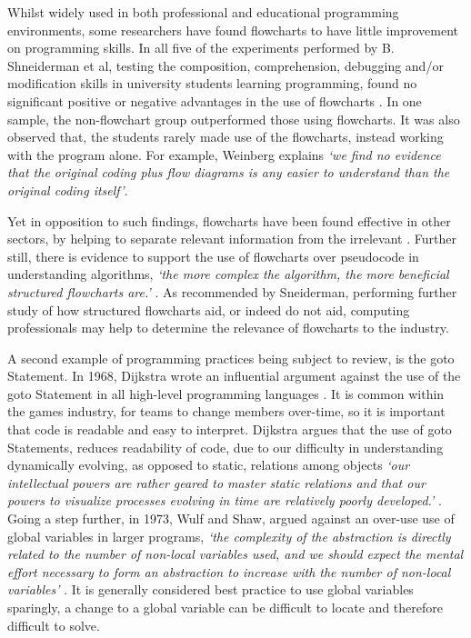 \documentclass{scrartcl}
\begin{document}
Whilst widely used in both professional and educational programming environments, some researchers have found flowcharts to have little improvement on programming skills. In all five of the experiments performed by B. Shneiderman et al, testing the composition, comprehension, debugging and/or modification skills in university students learning programming, found no significant positive or negative advantages in the use of flowcharts \cite{Shneiderman1977}. In one sample, the non-flowchart group outperformed those using flowcharts. It was also observed that, the students rarely made use of the flowcharts, instead working with the program alone. For example, Weinberg explains \textit{`we find no evidence that the original coding plus flow diagrams is any easier to understand than the original coding itself'}\cite{Weinberg}. 

Yet in opposition to such findings, flowcharts have been found effective in other sectors, by helping to separate relevant information from the irrelevant \cite{Kammann1975}. Further still, there is evidence to support the use of flowcharts over pseudocode in understanding algorithms, \textit{`the more complex the algorithm, the more beneficial structured flowcharts are.'} \cite{Scanlan}. As recommended by Sneiderman, performing further study of how structured flowcharts aid, or indeed do not aid, computing professionals may help to determine the relevance of flowcharts to the industry.

A second example of programming practices being subject to review, is the goto Statement. In 1968, Dijkstra wrote an influential argument against the use of the goto Statement in all high-level programming languages \cite{Dijkstra}. It is common within the games industry, for teams to change members over-time, so it is important that code is readable and easy to interpret. Dijkstra argues that the use of goto Statements, reduces readability of code, due to our difficulty in understanding dynamically evolving, as opposed to static, relations among objects \textit{`our intellectual powers are rather geared to master static relations and that our powers to visualize processes evolving in time are relatively poorly developed.'} \cite{Dijkstra}. Going a step further, in 1973, Wulf and Shaw, argued against an over-use use of global variables in larger programs, \textit{`the complexity of the abstraction is directly related to the number of non-local variables used, and we should expect the mental effort necessary to form an abstraction to increase with the number of non-local variables'} \cite{Wulf}. It is generally considered best practice to use global variables sparingly, a change to a global variable can be difficult to locate and therefore difficult to solve.
\end{document}
